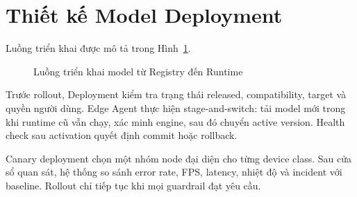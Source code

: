 \section{Thiết kế Model Deployment}

Luồng triển khai được mô tả trong Hình~\ref{fig:model-deployment-design}.

\begin{figure}[H]
\centering
{}
\caption{Luồng triển khai model từ Registry đến Runtime}
\label{fig:model-deployment-design}
\end{figure}

Trước rollout, Deployment kiểm tra trạng thái released, compatibility, target và
quyền người dùng. Edge Agent thực hiện stage-and-switch: tải model mới trong khi
runtime cũ vẫn chạy, xác minh engine, sau đó chuyển active version. Health check
sau activation quyết định commit hoặc rollback.

Canary deployment chọn một nhóm node đại diện cho từng device class. Sau cửa sổ
quan sát, hệ thống so sánh error rate, FPS, latency, nhiệt độ và incident với
baseline. Rollout chỉ tiếp tục khi mọi guardrail đạt yêu cầu.
